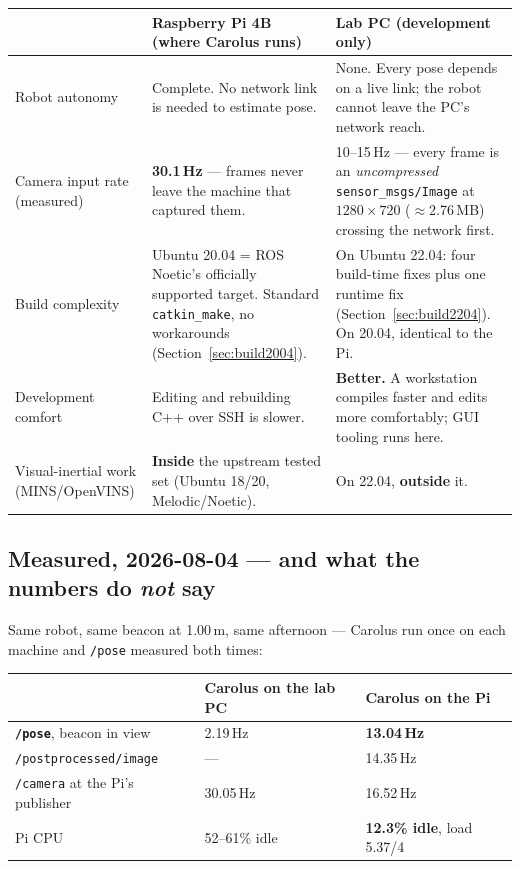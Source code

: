 \documentclass[11pt]{report}
\begin{document}
\begin{center}
\begin{tabular}{p{}p{}p{}}
\toprule
 & \textbf{Raspberry Pi 4B (where Carolus runs)} & \textbf{Lab PC (development only)} \\
\midrule
Robot autonomy
 & Complete. No network link is needed to estimate pose.
 & None. Every pose depends on a live link; the robot cannot leave the PC's
   network reach. \\
\addlinespace
Camera input rate (measured)
 & \textbf{30.1\,Hz} --- frames never leave the machine that captured them.
 & 10--15\,Hz --- every frame is an \emph{uncompressed}
   \texttt{sensor\_msgs/Image} at $1280\times720$ ($\approx$2.76\,MB)
   crossing the network first. \\
\addlinespace
Build complexity
 & Ubuntu 20.04 = ROS Noetic's officially supported target. Standard
   \texttt{catkin\_make}, no workarounds (Section~\ref{sec:build2004}).
 & On Ubuntu 22.04: four build-time fixes plus one runtime fix
   (Section~\ref{sec:build2204}). On 20.04, identical to the Pi. \\
\addlinespace
Development comfort
 & Editing and rebuilding C++ over SSH is slower.
 & \textbf{Better.} A workstation compiles faster and edits more
   comfortably; GUI tooling runs here. \\
\addlinespace
Visual-inertial work (MINS/OpenVINS)
 & \textbf{Inside} the upstream tested set (Ubuntu 18/20, Melodic/Noetic).
 & On 22.04, \textbf{outside} it. \\
\bottomrule
\end{tabular}
\end{center}

\subsection{Measured, 2026-08-04 --- and what the numbers do \emph{not} say}
\label{sec:pi-benchmark}

Same robot, same beacon at 1.00\,m, same afternoon --- Carolus run once on
each machine and \texttt{/pose} measured both times:

\begin{center}
\begin{tabular}{lll}
\toprule
 & Carolus on the \textbf{lab PC} & Carolus on the \textbf{Pi} \\
\midrule
\textbf{\texttt{/pose}}, beacon in view & 2.19\,Hz & \textbf{13.04\,Hz} \\
\texttt{/postprocessed/image} & --- & 14.35\,Hz \\
\texttt{/camera} at the Pi's publisher & 30.05\,Hz & 16.52\,Hz \\
Pi CPU & 52--61\% idle & \textbf{12.3\% idle}, load 5.37/4 \\
\bottomrule
\end{tabular}
\end{center}
\end{document}
